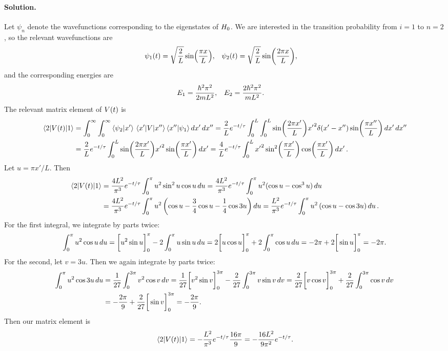 \documentclass[11pt]{article}
\newcommand{\beq}{\begin{equation*}}
\newcommand{\eeq}{\end{equation*}}
\newenvironment{solution}
{
    \paragraph{Solution.}
    \ignorespaces
}
{
}
\begin{document}
\begin{solution}
	Let $\psi_n$ denote the wavefunctions corresponding to the eigenstates of $H_0$.  We are interested in the transition probability from $i = 1$ to $n = 2$, so the relevant wavefunctions are
	\begin{align*}
		\psi_1(t) &= \sqrt{\frac{2}{L}} \sin(\frac{\pi x}{L}), &
		\psi_2(t) &= \sqrt{\frac{2}{L}} \sin(\frac{2\pi x}{L}),
	\end{align*}
	and the corresponding energies are
	\begin{align*}
		E_1 &= \frac{\hbar^2 \pi^2}{2 m L^2}, &
		E_2 &= \frac{2 \hbar^2 \pi^2}{m L^2}.
	\end{align*}
	The relevant matrix element of $V(t)$ is
	\begin{align*}
		\mel{2}{V(t)}{1} &= \int_0^\infty \int_0^\infty \braket{\psi_2}{x'} \mel{x'}{V}{x''} \braket{x''}{\psi_1} \dd{x'} \dd{x''}
		= \frac{2}{L} e^{-t / \tau} \int_0^L \int_0^L \sin(\frac{2\pi x'}{L}) {x'}^2 \delta(x' - x'') \sin(\frac{\pi x''}{L}) \dd{x'} \dd{x''} \\
		&= \frac{2}{L} e^{-t / \tau} \int_0^L \sin(\frac{2\pi x'}{L}) {x'}^2 \sin(\frac{\pi x'}{L}) \dd{x'}
		= \frac{4}{L} e^{-t / \tau} \int_0^L {x'}^2 \sin[2](\frac{\pi x'}{L}) \cos(\frac{\pi x'}{L}) \dd{x'}.
	\end{align*}
	Let $u = \pi x' / L$.  Then
	\begin{align*}
		\mel{2}{V(t)}{1} &= \frac{4 L^2}{\pi^3} e^{-t / \tau} \int_0^\pi u^2 \sin^2{u} \cos{u} \dd{u}
		= \frac{4 L^2}{\pi^3} e^{-t / \tau} \int_0^\pi u^2 (\cos{u} - \cos^3{u}) \dd{u} \\
		&= \frac{4 L^2}{\pi^3} e^{-t / \tau} \int_0^\pi u^2 \left( \cos{u} - \frac{3}{4} \cos{u} - \frac{1}{4} \cos{3u} \right) \dd{u}
		= \frac{L^2}{\pi^3} e^{-t / \tau} \int_0^\pi u^2 \left( \cos{u} - \cos{3u} \right) \dd{u}.
	\end{align*}
	For the first integral, we integrate by parts twice:
	\beq
		\intopi u^2 \cos{u} \du = \bigg[ u^2 \sin{u} \bigg]_0^\pi - 2 \intopi u \sin{u} \du
		= 2 \bigg[ u \cos{u} \bigg]_0^\pi + 2 \intopi \cos{u} \du
		= -2 \pi + 2 \bigg[ \sin{u} \bigg]_0^\pi
		= -2 \pi.
	\eeq
	For the second, let $v = 3u$.  Then we again integrate by parts twice:
	\begin{align*}
		\int_0^\pi u^2 \cos{3u} \dd{u} &= \frac{1}{27} \int_0^{3\pi} v^2 \cos{v} \dd{v}
		= \frac{1}{27} \bigg[ v^2 \sin{v} \bigg]_0^{3\pi} - \frac{2}{27} \int_0^{3\pi} v \sin{v} \dd{v}
		= \frac{2}{27} \bigg[ v \cos{v} \bigg]_0^{3\pi} + \frac{2}{27} \int_0^{3\pi} \cos{v} \dd{v} \\
		&= -\frac{2\pi}{9} + \frac{2}{27} \bigg[ \sin{v} \bigg]_0^{3\pi}
		= -\frac{2\pi}{9}.
	\end{align*}
	Then our matrix element is
	\beq
		\mel{2}{\Vt}{1} = -\frac{L^2}{\pi^3} e^{-t / \tau} \frac{16 \pi}{9}
		= -\frac{16 L^2}{9 \pi^2} e^{-t / \tau}.
	\eeq
	
\end{solution}
\end{document}
